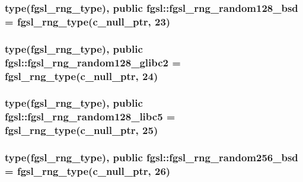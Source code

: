 \hypertarget{classfgsl_a398996158c507375c9f2d554deb5d27b}{
\subsubsection[{fgsl\-\_\-rng\-\_\-random128\-\_\-bsd}]{\setlength{\rightskip}{0pt plus 5cm}type({\bf fgsl\-\_\-rng\-\_\-type}), public fgsl\-::fgsl\-\_\-rng\-\_\-random128\-\_\-bsd = {\bf fgsl\-\_\-rng\-\_\-type}(c\-\_\-null\-\_\-ptr, 23)}}\label{classfgsl_a398996158c507375c9f2d554deb5d27b}
\hypertarget{classfgsl_aa3d875270ff8191378a356c1b7aadc43}{
\subsubsection[{fgsl\-\_\-rng\-\_\-random128\-\_\-glibc2}]{\setlength{\rightskip}{0pt plus 5cm}type({\bf fgsl\-\_\-rng\-\_\-type}), public fgsl\-::fgsl\-\_\-rng\-\_\-random128\-\_\-glibc2 = {\bf fgsl\-\_\-rng\-\_\-type}(c\-\_\-null\-\_\-ptr, 24)}}\label{classfgsl_aa3d875270ff8191378a356c1b7aadc43}
\hypertarget{classfgsl_a49f71c990dc8dddacbdcdc1a012c4654}{
\subsubsection[{fgsl\-\_\-rng\-\_\-random128\-\_\-libc5}]{\setlength{\rightskip}{0pt plus 5cm}type({\bf fgsl\-\_\-rng\-\_\-type}), public fgsl\-::fgsl\-\_\-rng\-\_\-random128\-\_\-libc5 = {\bf fgsl\-\_\-rng\-\_\-type}(c\-\_\-null\-\_\-ptr, 25)}}\label{classfgsl_a49f71c990dc8dddacbdcdc1a012c4654}
\hypertarget{classfgsl_aa0a98fef28a7dc6e538ab97f5f07fc22}{
\subsubsection[{fgsl\-\_\-rng\-\_\-random256\-\_\-bsd}]{\setlength{\rightskip}{0pt plus 5cm}type({\bf fgsl\-\_\-rng\-\_\-type}), public fgsl\-::fgsl\-\_\-rng\-\_\-random256\-\_\-bsd = {\bf fgsl\-\_\-rng\-\_\-type}(c\-\_\-null\-\_\-ptr, 26)}}\label{classfgsl_aa0a98fef28a7dc6e538ab97f5f07fc22}
